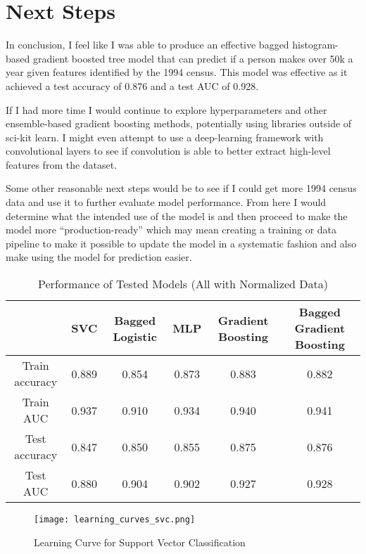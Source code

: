 \documentclass[11pt]{article}
\begin{document}
\section*{Next Steps}
In conclusion, I feel like I was able to produce an effective bagged histogram-based gradient boosted tree model that can predict if a person makes over 50k a year given features identified by the 1994 census.
This model was effective as it achieved a test accuracy of 0.876 and a test AUC of 0.928.

If I had more time I would continue to explore hyperparameters and other ensemble-based gradient boosting methods, potentially using libraries outside of sci-kit learn.
I might even attempt to use a deep-learning framework with convolutional layers to see if convolution is able to better extract high-level features from the dataset.

Some other reasonable next steps would be to see if I could get more 1994 census data and use it to further evaluate model performance.
From here I would determine what the intended use of the model is and then proceed to make the model more ``production-ready'' which may mean creating a training or data pipeline to make it possible to update the model in a systematic fashion and also make using the model for prediction easier.

\vspace{1in}

\begin{table}[h]
    \begin{center}
    \begin{tabular}{|c|c|c|c|c|c|}
        \hline
        & SVC & Bagged Logistic & MLP & Gradient Boosting & Bagged Gradient Boosting \\
        \hline
        Train accuracy & 0.889 & 0.854 & 0.873 & 0.883 & 0.882 \\
        \hline
        Train AUC & 0.937 & 0.910 & 0.934 & 0.940 & 0.941 \\
        \hline
        Test accuracy & 0.847 & 0.850 & 0.855 & 0.875 & 0.876 \\
        \hline
        Test AUC & 0.880 & 0.904 & 0.902 & 0.927 & 0.928 \\
        \hline
    \end{tabular}
    \end{center}
\caption{Performance of Tested Models (All with Normalized Data)}
\label{table:model_performance}
\end{table}

\begin{figure}[h]
\begin{center}
    \texttt{[image: learning\_curves\_svc.png]}
\end{center}
\caption{Learning Curve for Support Vector Classification}
\label{fig:learning_curve_svc}
\end{figure}
\end{document}
